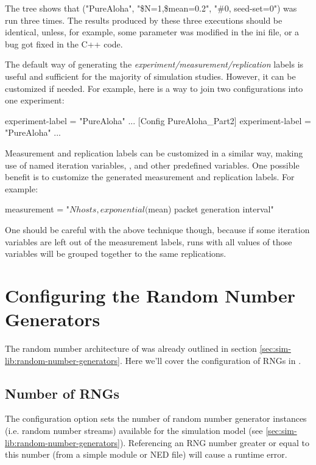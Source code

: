 The tree shows that ("PureAloha", "\$N=1,\$mean=0.2", "\#0, seed-set=0")
was run three times. The results produced
by these three executions should be identical, unless, for example,
some parameter was modified in the ini file, or a bug got fixed in the
C++ code.

The default way of generating the \textit{experiment/measurement/replication}
labels is useful and sufficient for the majority of simulation studies.
However, it can be customized if needed. For example, here is a way to join two
configurations into one experiment:

\begin{inifile}
experiment-label = "PureAloha"
...
[Config PureAloha_Part2]
experiment-label = "PureAloha"
...
\end{inifile}

Measurement and replication labels can be customized in a similar way,
making use of named iteration variables, ,
 and other predefined variables. One possible benefit is
to customize the generated measurement and replication labels. For
example:

\begin{inifile}
measurement = "${N} hosts, exponential(${mean}) packet generation interval"
\end{inifile}

One should be careful with the above technique though, because if some
iteration variables are left out of the measurement labels, runs with
all values of those variables will be grouped together to the same
replications.


\section{Configuring the Random Number Generators}
\label{sec:config-sim:rng-config}

The random number architecture of {\opp} was already outlined
in section \ref{sec:sim-lib:random-number-generators}. Here
we'll cover the configuration of RNGs in .

\subsection{Number of RNGs}
\label{sec:config-sim:number-of-rngs}

The  configuration option sets the number of
random number generator instances (i.e. random number streams)
available for the simulation model (see \ref{sec:sim-lib:random-number-generators}).
Referencing an RNG number greater or equal to this number
(from a simple module or NED file) will cause a runtime error.


